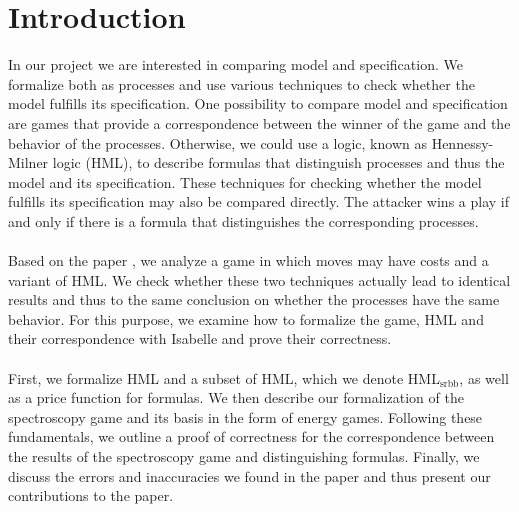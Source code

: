 \newpage
\section{Introduction}
In our project we are interested in comparing model and specification.
We formalize both as processes and use various techniques to check whether the model fulfills its specification.
One possibility to compare model and specification are games that provide a correspondence between the winner of the game and the behavior of the processes.
Otherwise, we could use a logic, known as Hennessy-Milner logic (HML), to describe formulas that distinguish processes and thus the model and its specification.
These techniques for checking whether the model fulfills its specification may also be compared directly.
The attacker wins a play if and only if there is a formula that distinguishes the corresponding processes.
\\\\
Based on the paper \cite{bisping2023lineartimebranchingtime}, we analyze a game in which moves may have costs and a variant of HML.
We check whether these two techniques actually lead to identical results and thus to the same conclusion on whether the processes have the same behavior.
For this purpose, we examine how to formalize the game, HML and their correspondence with Isabelle and prove their correctness.
\\\\
First, we formalize HML and a subset of HML, which we denote HML$_\text{srbb}$, as well as a price function for formulas.
We then describe our formalization of the spectroscopy game and its basis in the form of energy games.
Following these fundamentals, we outline a proof of correctness for the correspondence between the results of the spectroscopy game and distinguishing formulas.
Finally, we discuss the errors and inaccuracies we found in the paper and thus present our contributions to the paper\cite{bisping2023lineartimebranchingtime}.